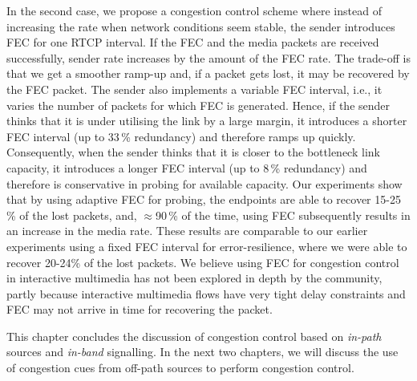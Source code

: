 In the second case, we propose a congestion control scheme where instead of
increasing the rate when network conditions seem stable, the sender introduces
FEC for one RTCP interval. If the FEC and the media packets are received
successfully, sender rate increases by the amount of the FEC rate. 
The trade-off is that we get a smoother ramp-up and, if a packet gets
lost, it may be recovered by the FEC packet. The sender also implements a
variable FEC interval, i.e., it varies the number of packets for which FEC is
generated. Hence, if the sender thinks that it is under utilising the link by a
large margin, it introduces a shorter FEC interval (up to 33\,\% redundancy)
and therefore ramps up quickly. Consequently, when the sender thinks that it is closer
to the bottleneck link capacity, it introduces a longer FEC interval (up to
8\,\% redundancy) and therefore is conservative in probing for available
capacity. Our experiments show that by using adaptive FEC for probing, the
endpoints are able to recover 15-25\,\% of the lost packets, and,
$\approx$90\,\% of the time, using FEC subsequently results in an increase in
the media rate. These results are comparable to our earlier experiments using
a fixed FEC interval for error-resilience, where we were able to recover
20-24\;\% of the lost packets. We believe using FEC for congestion control in
interactive multimedia has not been explored in depth by the community, partly
because interactive multimedia flows have very tight delay constraints and FEC
may not arrive in time for recovering the packet.

This chapter concludes the discussion of congestion control based on 
\emph{in-path} sources and \emph{in-band} signalling. In the next two chapters, we will
discuss the use of congestion cues from off-path sources to perform congestion
control.
